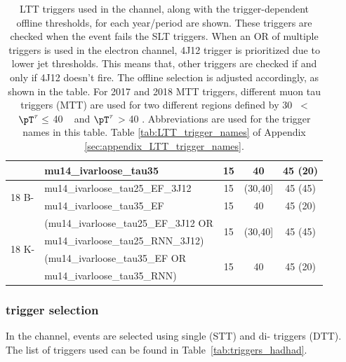 \begin{table}
\begin{tabular}{llccc}
                      & mu14\_ivarloose\_tau35 &15 & 40 & 45 (20) \\
      \midrule
      \multirow{2}{*}{18 B-}  & mu14\_ivarloose\_tau25\_EF\_3J12 & 15 & (30,40] & 45 (45) \\ \cmidrule{2-5}
                      & mu14\_ivarloose\_tau35\_EF & 15 & 40 & 45 (20) \\
      \midrule
        \multirow{4}{*}{18 K-}  & (mu14\_ivarloose\_tau25\_EF\_3J12 OR & \multirow{2}{*}{15} &  \multirow{2}{*}{(30,40]} & \multirow{2}{*}{45 (45)}\\
                     & mu14\_ivarloose\_tau25\_RNN\_3J12) & & &\\ \cmidrule{2-5}
                     & (mu14\_ivarloose\_tau35\_EF OR &\multirow{2}{*}{15} & \multirow{2}{*}{40}  & \multirow{2}{*}{45 (20)}\\
                     & mu14\_ivarloose\_tau35\_RNN) & & &\\                     
    \bottomrule
  \end{tabular}
  \caption{LTT triggers used in the \lephad channel, along with the trigger-dependent offline \pT thresholds, for each year/period are shown. 
  These triggers are checked when the event fails the SLT triggers. 
  When an OR of multiple triggers is used in the electron channel, 4J12 trigger is prioritized due to lower jet \pT thresholds. 
  This means that, other triggers are checked if and only if 4J12 doesn't fire. The offline selection is adjusted accordingly, as shown in the table.
 For 2017 and 2018 MTT triggers, different muon tau triggers (MTT) are used for two different regions defined by 30 \GeV~< $\pT^{\tau} \leq$ 40 \GeV~ and $\pT^{\tau}$ > 40 \GeV. 
  Abbreviations are used for the trigger names in this table. Table \ref{tab:LTT_trigger_names} of Appendix \ref{sec:appendix_LTT_trigger_names}.}
  \label{tab:LTTtriggers_lephad}
\end{table}

\subsubsection{\hadhad trigger selection}
\label{sec:hadhad_trigger_selection}

In the \tauhad\tauhad channel, events are selected using single (STT) and di-\tauhad
triggers (DTT). The list of triggers used can be found in Table~\ref{tab:triggers_hadhad}.

